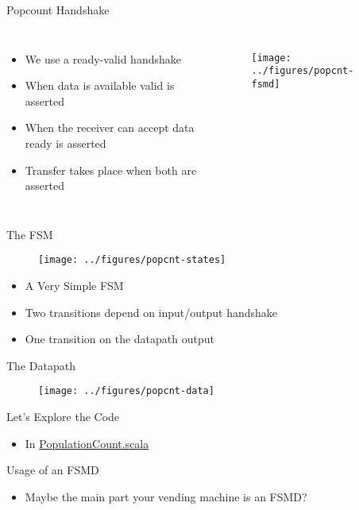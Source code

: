 \begin{frame}[fragile]{Popcount Handshake}
\begin{columns}
\begin{itemize}
\item We use a ready-valid handshake
\item When data is available valid is asserted
\item When the receiver can accept data ready is asserted
\item Transfer takes place when both are asserted
\end{itemize}
\begin{figure}
  \texttt{[image: ../figures/popcnt-fsmd]}
\end{figure}
\end{columns}
\end{frame}


\begin{frame}[fragile]{The FSM}
\begin{figure}
  \texttt{[image: ../figures/popcnt-states]}
\end{figure}
\begin{itemize}
\item A Very Simple FSM
\item Two transitions depend on input/output handshake
\item One transition on the datapath output
\end{itemize}
\end{frame}

\begin{frame}[fragile]{The Datapath}
\begin{figure}
  \texttt{[image: ../figures/popcnt-data]}
\end{figure}
\end{frame}

\begin{frame}[fragile]{Let's Explore the Code}
\begin{itemize}
\item In \href{https://github.com/schoeberl/chisel-book/blob/master/src/main/scala/PopulationCount.scala}{PopulationCount.scala}
\end{itemize}
\end{frame}

\begin{frame}[fragile]{Usage of an FSMD}
\begin{itemize}
\item Maybe the main part your vending machine is an FSMD?
\end{itemize}
\end{frame}





